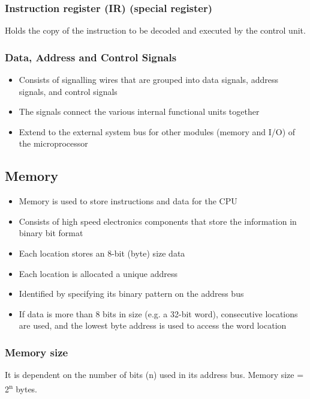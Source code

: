 \documentclass[11pt]{article}
\begin{document}
\subsubsection{Instruction register (IR) (special register)}
\label{sec:org17f14f7}
Holds the copy of the instruction to be decoded and executed by the control unit.

\subsubsection{Data, Address and Control Signals}
\label{sec:orga804cc0}
\begin{itemize}
\item Consists of signalling wires that are grouped into data signals, address signals, and control signals
\item The signals connect the various internal functional units together
\item Extend to the external system bus for other modules (memory and I/O) of the microprocessor
\end{itemize}

\subsection{Memory}
\label{sec:orgb6aef72}
\begin{itemize}
\item Memory is used to store instructions and data for the CPU
\item Consists of high speed electronics components that store the information in binary bit format
\item Each location stores an 8-bit (byte) size data
\item Each location is allocated a unique address
\item Identified by specifying its binary pattern on the address bus
\item If data is more than 8 bits in size (e.g. a 32-bit word), consecutive locations are used, and the lowest byte address is used to access the word location
\end{itemize}

\subsubsection{Memory size}
\label{sec:orgda5c132}
It is dependent on the number of bits (n) used in its address bus. Memory size = 2\textsuperscript{n} bytes.
\end{document}
